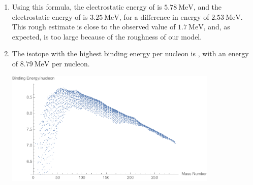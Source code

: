 \documentclass[10pt]{article}
\begin{document}
\begin{enumerate}
    \item Using this formula, the electrostatic energy of  is $\SI{5.78}{\mega\electronvolt}$, and the electrostatic energy of  is $\SI{3.25}{\mega\electronvolt}$, for a difference in energy of $\SI{2.53}{\mega\electronvolt}$. This rough estimate is close to the observed value of $\SI{1.7}{\mega\electronvolt}$, and, as expected, is too large because of the roughness of our model.

    \item The isotope with the highest binding energy per nucleon is , with an energy of $\SI{8.79}{\mega\electronvolt}$ per nucleon.

    \includegraphics[width=0.8\textwidth]{isotopeChart}
  \end{enumerate}
\end{document}
